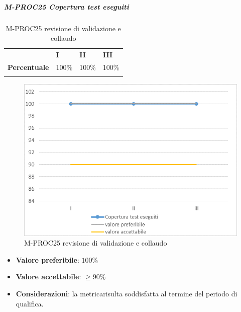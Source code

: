 \subparagraph{M-PROC25 Copertura test eseguiti} \mbox{}
\begin{longtable}[H!] {						
		>{}p{35mm}  		
		>{}p{12mm}
		>{}p{12mm}		
		>{}p{12mm}		
	}
	\rowcolor{gray!50}
	\textbf{} & \textbf{I} & \textbf{II} & \textbf{III} \TBstrut \\ [2mm]
	\textbf{Percentuale} & 100\% & 100\% & 100\% \TBstrut \\ [2mm]
	\rowcolor{white}
	\caption{M-PROC25 revisione di validazione e collaudo}
\end{longtable}
\begin{figure}[H] 	
	\includegraphics[width=\linewidth]{./img/grafici/RA25.png}	
	\caption{M-PROC25 revisione di validazione e collaudo}	
\end{figure}
\begin{itemize}
	\item \textbf{Valore preferibile}: $100\%$
	\item \textbf{Valore accettabile}: $\ge 90\%$
	\item \textbf{Considerazioni}: la metrica\glosp risulta soddisfatta al termine del periodo di qualifica.
\end{itemize}

